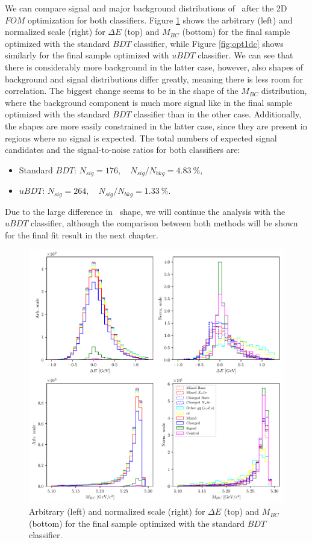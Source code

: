 We can compare signal and major background distributions of \vars~after the 2D $FOM$ optimization for both classifiers. Figure \ref{fig:opt01c} shows the arbitrary (left) and normalized scale (right) for $\Delta E$ (top) and $M_{BC}$ (bottom) for the final sample optimized with the standard $BDT$ classifier, while Figure \ref{fig:opt1dc} shows similarly for the final sample optimized with $uBDT$ classifier. We can see that there is considerably more background in the latter case, however, also shapes of background and signal distributions differ greatly, meaning there is less room for correlation. The biggest change seems to be in the shape of the $M_{BC}$ distribution, where the background component is much more signal like in the final sample optimized with the standard $BDT$ classifier than in the other case.  Additionally, the shapes are more easily constrained in the latter case, since they are present in regions where no signal is expected. The total numbers of expected signal candidates and the signal-to-noise ratios for both classifiers are:
\begin{itemize}
	\item Standard $BDT$: $N_{sig} = 176,\quad N_{sig}/N_{bkg} = 4.83~\%$,
	\item $uBDT$: $N_{sig} = 264,\quad N_{sig}/N_{bkg} = 1.33~\%$.
\end{itemize}
Due to the large difference in \vars~shape, we will continue the analysis with the $uBDT$ classifier, although the comparison between both methods will be shown for the final fit result in the next chapter.

\begin{figure}[H]
	\centering
	\captionsetup{width=0.8\linewidth}
	\includegraphics[width=\linewidth]{fig/opt_BB}
	\caption{Arbitrary (left) and normalized scale (right) for $\Delta E$ (top) and $M_{BC}$ (bottom) for the final sample optimized with the standard $BDT$ classifier.}
	\label{fig:opt01c}
\end{figure} 

